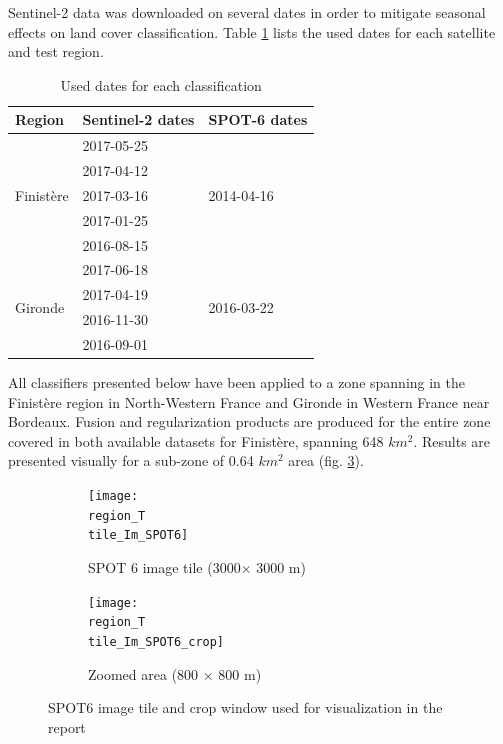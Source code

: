 \documentclass[10pt]{article}
\newcommand{\tile}{41000_30000}
\newcommand{\region}{finistere}
\begin{document}
Sentinel-2 data was downloaded on several dates in order to mitigate seasonal effects on land cover classification. Table \ref{table:dates} lists the used dates for each satellite and test region.
\begin{table}[H]
\centering
\begin{tabular}{lll}\toprule
Region & Sentinel-2 dates & SPOT-6 dates \\\hline
\multirow{5}{*}{Finistère} & 2017-05-25 & \multirow{5}{*}{2014-04-16} \\
 & 2017-04-12 &  \\
 & 2017-03-16 &  \\
 & 2017-01-25 &  \\
 & 2016-08-15 &  \\\hline
\multirow{4}{*}{Gironde} & 2017-06-18 & \multirow{4}{*}{2016-03-22} \\
 & 2017-04-19 &  \\
 & 2016-11-30 &  \\
 & 2016-09-01 &  \\\bottomrule
\end{tabular}
\caption{Used dates for each classification}
\label{table:dates}
\end{table}

All classifiers presented below have been applied to a zone spanning in the Finistère region in North-Western France and Gironde in Western France near Bordeaux. Fusion and regularization products are produced for the entire zone covered in both available datasets for Finistère, spanning 648 $km^2$. Results are presented visually for a sub-zone of 0.64 $km^2$ area (fig.  \ref{fig:area}).
\begin{figure}[H]
    \centering
    \begin{subfigure}{0.49\textwidth}
        \centering
        \texttt{[image: \\region\_T\\tile\_Im\_SPOT6]}
        \caption{SPOT 6 image tile (3000$\times$ 3000 m)}
        \label{fig:areaBig}
    \end{subfigure}
    \hfill
    \begin{subfigure}{0.49\textwidth}
        \centering
        \texttt{[image: \\region\_T\\tile\_Im\_SPOT6\_crop]}
        \caption{Zoomed area (800 $\times$ 800 m)}
        \label{fig:areaSmall}
    \end{subfigure}
    \caption{SPOT6 image tile and crop window used for visualization in the report}
    \label{fig:area}
    \centering
\end{figure}
\end{document}

